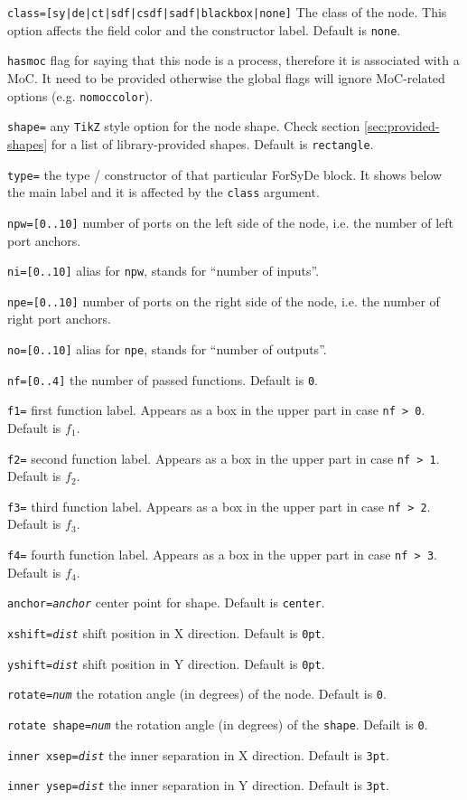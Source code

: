 \begin{optionslist}
\item \texttt{class=[sy|de|ct|sdf|csdf|sadf|blackbox|none]} The class of the node. This option affects the field color and the constructor label. Default is \texttt{none}.
\item \texttt{hasmoc} flag for saying that this node is a process, therefore it is associated with a MoC. It need to be provided otherwise the global flags will ignore MoC-related options (e.g. \texttt{nomoccolor}).
\item \texttt{shape=} any \texttt{TikZ} style option for the node shape. Check section \ref{sec:provided-shapes} for a list of library-provided shapes. Default is \texttt{rectangle}.
\item \texttt{type=} the type / constructor of that particular ForSyDe block. It shows below the main label and it is affected by the \texttt{class} argument.
\item \texttt{npw=[0..10]} number of ports on the left side of the node, i.e. the number of left port anchors.
\item \texttt{ni=[0..10]} alias for \texttt{npw}, stands for ``number of inputs''.
\item \texttt{npe=[0..10]} number of ports on the right side of the node, i.e. the number of right port anchors.
\item \texttt{no=[0..10]} alias for \texttt{npe}, stands for ``number of outputs''.
\item \texttt{nf=[0..4]} the number of passed functions. Default is \texttt{0}.
\item \texttt{f1=} first function label. Appears as a box in the upper part in case \texttt{nf > 0}. Default is $f_1$.
\item \texttt{f2=} second function label. Appears as a box in the upper part in case \texttt{nf > 1}. Default is $f_2$.
\item \texttt{f3=} third function label. Appears as a box in the upper part in case \texttt{nf > 2}. Default is $f_3$.
\item \texttt{f4=} fourth function label. Appears as a box in the upper part in case \texttt{nf > 3}. Default is $f_4$.
\item \texttt{anchor=\it anchor} center point for shape. Default is \texttt{center}.
\item \texttt{xshift=\it dist} shift position in X direction. Default is \texttt{0pt}.
\item \texttt{yshift=\it dist} shift position in Y direction. Default is \texttt{0pt}.
\item \texttt{rotate=\it num} the rotation angle (in degrees) of the node. Default is \texttt{0}.
\item \texttt{rotate shape=\it num} the rotation angle (in degrees) of the \texttt{shape}. Defailt is \texttt{0}.
\item \texttt{inner xsep=\it dist} the inner separation in X direction. Default is \texttt{3pt}.
\item \texttt{inner ysep=\it dist} the inner separation in Y direction. Default is \texttt{3pt}.

\end{optionslist}


